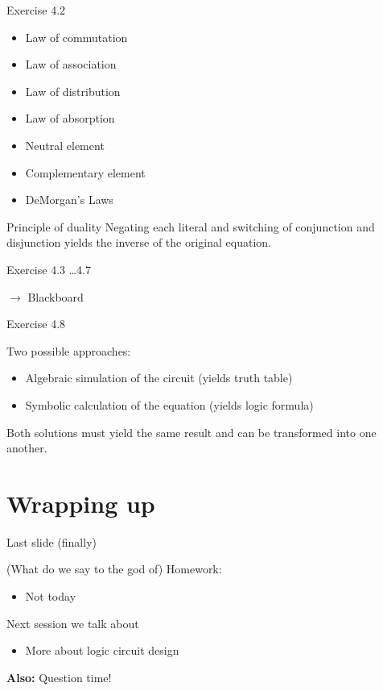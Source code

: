 \documentclass[11pt]{tudbeamer}
\begin{document}
\begin{frame}{Exercise 4.2}

	\begin{itemize}
		\item Law of commutation
		\item Law of association
		\item Law of distribution
		\item Law of absorption
		\item Neutral element
		\item Complementary element
		\item DeMorgan's Laws
	\end{itemize}
	
	\begin{block}{Principle of duality}
		Negating each literal and switching of conjunction and disjunction yields the inverse of the original equation.
	\end{block}

\end{frame}

\begin{frame}{Exercise 4.3 \dots 4.7}

	$\rightarrow$ Blackboard

\end{frame}

\begin{frame}{Exercise 4.8}

	Two possible approaches:\\
	\begin{itemize}
		\item Algebraic simulation of the circuit (yields truth table)
		\item Symbolic calculation of the equation (yields logic formula)
	\end{itemize}
	Both solutions must yield the same result and can be transformed into one another.

\end{frame}

\section{Wrapping up}

\begin{frame}{Last slide (finally)}

	(What do we say to the god of) Homework:
	\begin{itemize}
		\item Not today
	\end{itemize}
	\vspace{1em}
	
	Next session we talk about
	\begin{itemize}
		\item More about logic circuit design
	\end{itemize} 
	\vspace{1em}
	\textbf{Also:} Question time!

\end{frame}
\end{document}
